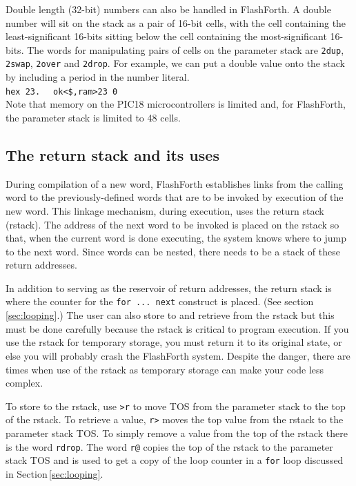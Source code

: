 \documentclass[12pt,a4paper]{article}
\begin{document}
\medskip
Double length (32-bit) numbers can also be handled in FlashForth.
A double number will sit on the stack as a pair of 16-bit cells, 
with the cell containing the least-significant 16-bits 
sitting below the cell containing the most-significant 16-bits. 
The words for manipulating pairs of cells on the parameter stack are
\verb!2dup!, \verb!2swap!, \verb!2over! and \verb!2drop!.
For example, we can put a double value onto the stack by including a period
in the number literal.\vspace{7pt} \\
\verb!hex 23. ! \fbox{$\hookleftarrow$} \verb! ok<$,ram>23 0! \vspace{7pt} \\

\medskip
Note that memory on the PIC18 microcontrollers is limited and,
for FlashForth, the parameter stack is limited to 48 cells.

\medskip
\subsection{The return stack and its uses}
\label{sec:return-stack}
%
During compilation of a new word, FlashForth establishes links from the calling word
to the previously-defined words that are to be invoked by execution of the new word.
This linkage mechanism, during execution, uses the return stack (rstack).
The address of the next word to be invoked is placed on the rstack so that,
when the current word is done executing, the system knows where to jump 
to the next word.
Since words can be nested, there needs to be a stack of these return addresses.

\medskip
In addition to serving as the reservoir of return addresses, 
the return stack is where the counter for the \verb!for ... next! construct is placed.
(See section\,\ref{sec:looping}.)
The user can also store to and retrieve from the rstack but this must be done carefully
because the rstack is critical to program execution.
If you use the rstack for temporary storage, you must return it to its original state,
or else you will probably crash the FlashForth system.
Despite the danger, there are times when use of the rstack as temporary storage can make
your code less complex.

\medskip
To store to the rstack, use \verb!>r! to move TOS from the parameter stack 
to the top of the rstack.
To retrieve a value, \verb!r>! moves the top value from the rstack 
to the parameter stack TOS.
To simply remove a value from the top of the rstack there is the word \verb!rdrop!.
The word \verb!r@! copies the top of the rstack to the parameter stack TOS 
and is used to get a copy of the loop counter in a \verb!for! loop 
discussed in Section\,\ref{sec:looping}. 
\end{document}
